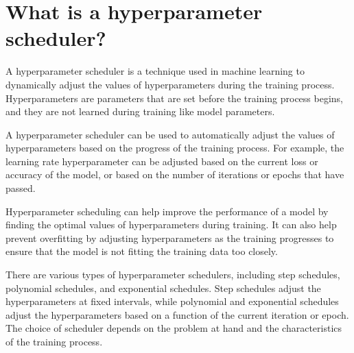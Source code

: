 \section{What is a hyperparameter scheduler?}
A hyperparameter scheduler is a technique used in machine learning to dynamically adjust the values of hyperparameters during the training process. Hyperparameters are parameters that are set before the training process begins, and they are not learned during training like model parameters.

A hyperparameter scheduler can be used to automatically adjust the values of hyperparameters based on the progress of the training process. For example, the learning rate hyperparameter can be adjusted based on the current loss or accuracy of the model, or based on the number of iterations or epochs that have passed.

Hyperparameter scheduling can help improve the performance of a model by finding the optimal values of hyperparameters during training. It can also help prevent overfitting by adjusting hyperparameters as the training progresses to ensure that the model is not fitting the training data too closely.

There are various types of hyperparameter schedulers, including step schedules, polynomial schedules, and exponential schedules. Step schedules adjust the hyperparameters at fixed intervals, while polynomial and exponential schedules adjust the hyperparameters based on a function of the current iteration or epoch. The choice of scheduler depends on the problem at hand and the characteristics of the training process.

